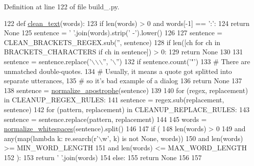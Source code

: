 Definition at line 122 of file build\+\_.\+py.


\begin{DoxyCode}
122 \textcolor{keyword}{def }\hyperlink{namespaceparlai_1_1tasks_1_1opensubtitles_1_1build__2018_a1bee89083b3ee54e034611194dd4e8ae}{clean\_text}(words):
123     \textcolor{keywordflow}{if} len(words) > 0 \textcolor{keywordflow}{and} words[-1] == \textcolor{stringliteral}{':'}:
124         \textcolor{keywordflow}{return} \textcolor{keywordtype}{None}
125     sentence = \textcolor{stringliteral}{' '}.join(words).strip(\textcolor{stringliteral}{' -'}).lower()
126 
127     sentence = CLEAN\_BRACKETS\_REGEX.sub(\textcolor{stringliteral}{''}, sentence)
128     \textcolor{keywordflow}{if} len([ch \textcolor{keywordflow}{for} ch \textcolor{keywordflow}{in} BRACKETS\_CHARACTERS \textcolor{keywordflow}{if} ch \textcolor{keywordflow}{in} sentence]) > 0:
129         \textcolor{keywordflow}{return} \textcolor{keywordtype}{None}
130 
131     sentence = sentence.replace(\textcolor{stringliteral}{'\(\backslash\)\(\backslash\)\(\backslash\)''}, \textcolor{stringliteral}{'\(\backslash\)''})
132     \textcolor{keywordflow}{if} sentence.count(\textcolor{stringliteral}{'"'}) %
133         \textcolor{comment}{# There are unmatched double-quotes.}
134         \textcolor{comment}{# Usually, it means a quote got splitted into separate utterances,}
135         \textcolor{comment}{# so it's bad example of a dialog}
136         \textcolor{keywordflow}{return} \textcolor{keywordtype}{None}
137 
138     sentence = \hyperlink{namespaceparlai_1_1tasks_1_1opensubtitles_1_1build__2018_a37607fa72082c0a8d4606157840496a7}{normalize\_apostrophe}(sentence)
139 
140     \textcolor{keywordflow}{for} (regex, replacement) \textcolor{keywordflow}{in} CLEANUP\_REGEX\_RULES:
141         sentence = regex.sub(replacement, sentence)
142     \textcolor{keywordflow}{for} (pattern, replacement) \textcolor{keywordflow}{in} CLEANUP\_REPLACE\_RULES:
143         sentence = sentence.replace(pattern, replacement)
144 
145     words = \hyperlink{namespaceparlai_1_1tasks_1_1opensubtitles_1_1build__2018_ae4802978106d19e628d0024c8404cab6}{normalize\_whitespaces}(sentence).split()
146 
147     \textcolor{keywordflow}{if} (
148         len(words) > 0
149         \textcolor{keywordflow}{and} any(map(\textcolor{keyword}{lambda} k: re.search(\textcolor{stringliteral}{r'\(\backslash\)w'}, k) \textcolor{keywordflow}{is} \textcolor{keywordflow}{not} \textcolor{keywordtype}{None}, words))
150         \textcolor{keywordflow}{and} len(words) >= MIN\_WORD\_LENGTH
151         \textcolor{keywordflow}{and} len(words) <= MAX\_WORD\_LENGTH
152     ):
153         \textcolor{keywordflow}{return} \textcolor{stringliteral}{' '}.join(words)
154     \textcolor{keywordflow}{else}:
155         \textcolor{keywordflow}{return} \textcolor{keywordtype}{None}
156 
157 
\end{DoxyCode}
